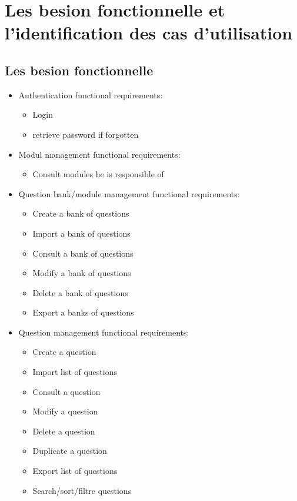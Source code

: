 \documentclass[a4paper,12p]{article}
\begin{document}
    \raggedright\section{Les besion fonctionnelle et l'identification des cas d'utilisation}
    \subsection{Les besion fonctionnelle}

    \begin{itemize}

        \item{Authentication functional requirements:}
        \begin{itemize}
            \item Login
            \item retrieve password if forgotten
        \end{itemize}

        \item{Modul management functional requirements:}
        \begin{itemize}
            \item Consult modules he is responsible of
        \end{itemize}

        \item{Question bank/module management functional requirements:}
        \begin{itemize}
            \item Create a bank of questions
            \item Import a bank of questions
            \item Consult a bank of questions
            \item Modify a bank of questions
            \item Delete a bank of questions
            \item Export a banks of questions
        \end{itemize}

        \item{Question management functional requirements:}
        \begin{itemize}
            \item Create a question
            \item Import list of questions
            \item Consult a question
            \item Modify a question
            \item Delete a question
            \item Duplicate a question
            \item Export list of questions
            \item Search/sort/filtre questions
        \end{itemize}


\end{itemize}
\end{document}
